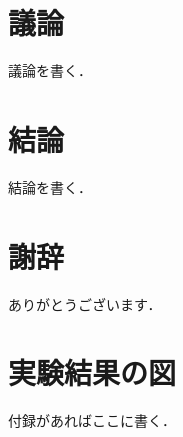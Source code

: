 \documentclass[a4paper, oneside, openany, dvipdfmx]{suribt}%
\begin{document}
\chapter{議論}
議論を書く．

\chapter{結論}
結論を書く．

\backmatter%
\chapter{謝辞}%
ありがとうございます．


\appendix%
\chapter{実験結果の図}
付録があればここに書く．
\end{document}
